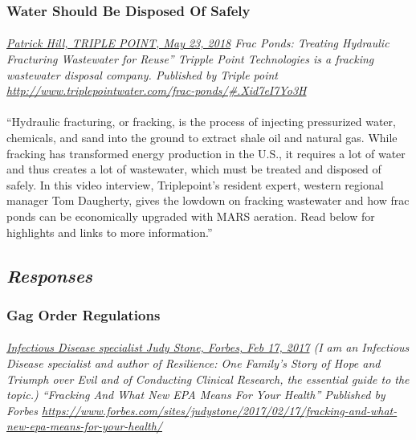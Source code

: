 \documentclass{article}
\begin{document}
\subsubsection{Water Should Be Disposed Of Safely}
\paragraph{}
\small
\textit{
\underline{Patrick Hill, TRIPLE POINT, May 23, 2018}
Frac Ponds: Treating Hydraulic Fracturing Wastewater for Reuse” Tripple Point Technologies is a fracking wastewater disposal company. Published by Triple point 
\url{http://www.triplepointwater.com/frac-ponds/\#.Xid7eI7Yo3H}}
\normalsize

\paragraph{}
``Hydraulic fracturing, or fracking, is the process of injecting pressurized water, chemicals, and sand into the ground to extract shale oil and natural gas. While fracking has transformed energy production in the U.S., it requires a lot of water and thus creates a lot of wastewater, which must be treated and disposed of safely. In this video interview, Triplepoint’s resident expert, western regional manager Tom Daugherty, gives the lowdown on fracking wastewater and how frac ponds can be economically upgraded with MARS aeration. Read below for highlights and links to more information.''

\subsection{\emph{Responses}}

\subsubsection{Gag Order Regulations}
\paragraph{}
\small
\textit{
\underline{Infectious Disease specialist Judy Stone, Forbes, Feb 17, 2017}
(I am an Infectious Disease specialist and author of Resilience: One Family's Story of Hope and Triumph over Evil and of Conducting Clinical Research, the essential guide to the topic.) ``Fracking And What New EPA Means For Your Health'' Published by Forbes   
\url{https://www.forbes.com/sites/judystone/2017/02/17/fracking-and-what-new-epa-means-for-your-health/}}
\normalsize
\end{document}

